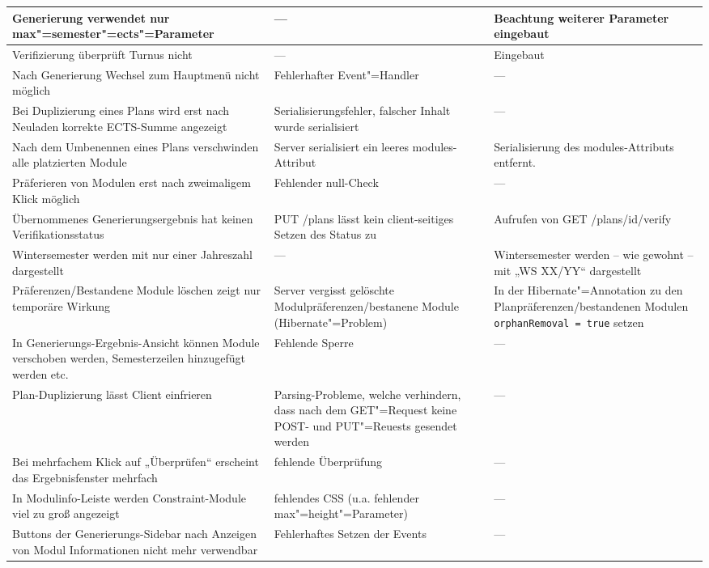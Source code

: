 \begin{longtable}{| >{\hspace{0pt}} p{} | >{\hspace{0pt}} p{} | >{\hspace{0pt}} p{} | }
	\hline
	Generierung verwendet nur max"=semester"=ects"=Parameter & --- & Beachtung weiterer Parameter eingebaut \\
	\hline
	Verifizierung überprüft Turnus nicht & --- & Eingebaut \\
	\hline
	Nach Generierung Wechsel zum Hauptmenü nicht möglich & Fehlerhafter Event"=Handler & --- \\
	\hline
	Bei Duplizierung eines Plans wird erst nach Neuladen korrekte ECTS-Summe angezeigt & Serialisierungsfehler, falscher Inhalt wurde serialisiert & --- \\
	\hline
	Nach dem Umbenennen eines Plans verschwinden alle platzierten Module & Server serialisiert ein leeres modules-Attribut & Serialisierung des modules-Attributs entfernt. \\
	\hline
	Präferieren von Modulen erst nach zweimaligem Klick möglich & Fehlender null-Check & --- \\
	\hline
	Übernommenes Generierungsergebnis hat keinen Verifikationsstatus & PUT /plans lässt kein client-seitiges Setzen des Status zu & Aufrufen von GET /plans/id/verify \\
	\hline
	Wintersemester werden mit nur einer Jahreszahl dargestellt & --- & Wintersemester werden – wie gewohnt – mit „WS XX/YY“ dargestellt \\
	\hline
	Präferenzen/Bestandene Module löschen zeigt nur temporäre Wirkung & Server vergisst gelöschte Modulpräferenzen/bestanene Module (Hibernate"=Problem) & In der Hibernate"=Annotation zu den Planpräferenzen/bestandenen Modulen \texttt{orphanRemoval = true} setzen \\
	\hline
	In Generierungs-Ergebnis-Ansicht können Module verschoben werden, Semesterzeilen hinzugefügt werden etc. & Fehlende Sperre & --- \\
	\hline
	Plan-Duplizierung lässt Client einfrieren & Parsing-Probleme, welche verhindern, dass nach dem GET"=Request keine POST- und PUT"=Reuests gesendet werden & --- \\
	\hline
	Bei mehrfachem Klick auf „Überprüfen“ erscheint das Ergebnisfenster mehrfach & fehlende Überprüfung & --- \\
	\hline
	In Modulinfo-Leiste werden Constraint-Module viel zu groß angezeigt & fehlendes CSS (u.a. fehlender max"=height"=Parameter) & --- \\
	\hline
	Buttons der Generierungs-Sidebar nach Anzeigen von Modul Informationen nicht mehr verwendbar & Fehlerhaftes Setzen der Events & --- \\
	\hline

\end{longtable}
